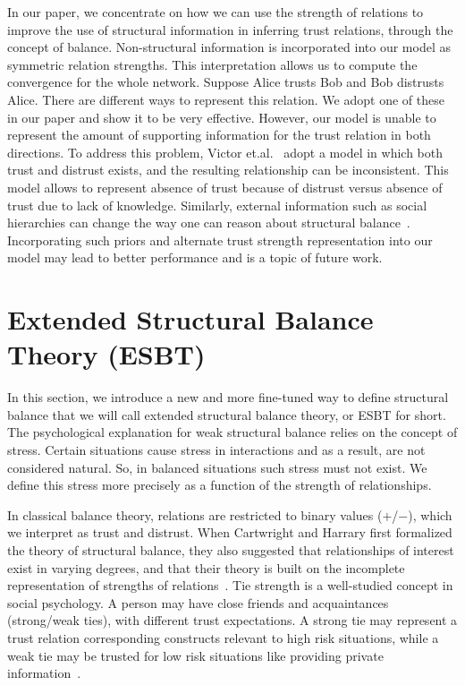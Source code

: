 \documentclass[acmtweb]{acmsmall}
\begin{document}
In our paper, we concentrate on how we can use the strength of relations
to improve the use of structural information in inferring trust
relations, through the concept of balance. Non-structural information
is incorporated into our model as symmetric relation strengths. This
interpretation allows us to compute the convergence for the whole
network. Suppose Alice trusts Bob and Bob distrusts Alice. There are
different ways to represent this relation. We adopt one of these in
our paper and show it to be very effective. However, our model is
unable to represent the amount of supporting information for the trust
relation in both directions. To address this problem, Victor
et.al.~\cite{Victor:2011} adopt a model in which both trust and
distrust exists, and the resulting relationship can be
inconsistent. This model allows to represent absence of trust because
of distrust versus absence of trust due to lack of
knowledge. Similarly, external information such as social hierarchies
can change the way one can reason about structural
balance~\cite{Huang:2013}. Incorporating such priors and alternate
trust strength representation into our model may lead to better
performance and is a topic of future work.


\section{Extended Structural Balance Theory (ESBT)} \label{sec:esbt}
In this section, we introduce a new and more fine-tuned way to define
structural balance that we will call extended structural balance
theory, or ESBT for short. The psychological explanation for weak
structural balance relies on the concept of stress. Certain situations
cause stress in interactions and as a result, are not considered
natural. So, in balanced situations such stress must not exist. We
define this stress more precisely as a function of the strength of
relationships.

In classical balance theory, relations are restricted to binary values
($+$/$-$), which we interpret as trust and distrust. When Cartwright
and Harrary first formalized the theory of structural balance, they
also suggested that relationships of interest exist in varying
degrees, and that their theory is built on the incomplete
representation of strengths of relations~\cite{Cartwright:56}. Tie
strength is a well-studied concept in social psychology. A person may
have close friends and acquaintances (strong/weak ties), with
different trust expectations. A strong tie may represent a trust
relation corresponding constructs relevant to high risk situations,
while a weak tie may be trusted for low risk situations like providing
private information~\cite{Granovetter:1973}.
\end{document}
